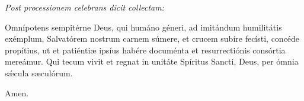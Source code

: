 \textit{Post processionem celebrans dicit collectam:}

Omnípotens sempitérne Deus, qui humáno géneri, ad imitándum humilitátis exémplum, Salvatórem nostrum carnem súmere, et crucem subíre fecísti, concéde propítius, ut et patiéntiæ ipsíus habére documénta et resurrectiónis consórtia mereámur. Qui tecum vivit et regnat in unitáte Spíritus Sancti, Deus, per ómnia sǽcula sæculórum.

\Rbardot{} Amen.
